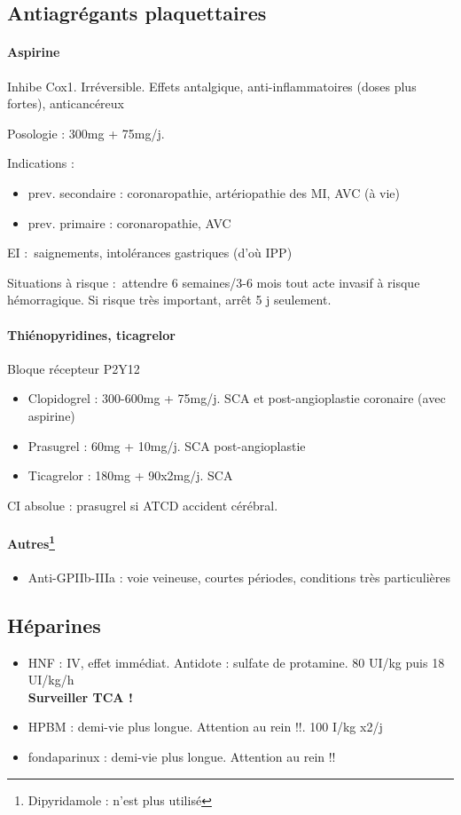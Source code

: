 \documentclass{article}
\begin{document}
\subsection{Antiagrégants plaquettaires}
\paragraph{Aspirine}
Inhibe Cox1. Irréversible. Effets antalgique, anti-inflammatoires (doses plus
fortes), anticancéreux

Posologie : 300mg + 75mg/j.

Indications : 
\begin{itemize}
  \item prev. secondaire : coronaropathie, artériopathie des MI, AVC (à
vie)
\item  prev. primaire : coronaropathie, AVC
\end{itemize}

EI : saignements, intolérances gastriques (d'où IPP)

Situations à risque : attendre 6 semaines/3-6 mois tout acte invasif à risque
hémorragique. Si risque très important, arrêt 5 j seulement.

\paragraph{Thiénopyridines, ticagrelor}
Bloque récepteur P2Y12
\begin{itemize}
  \item Clopidogrel : 300-600mg + 75mg/j. SCA et post-angioplastie coronaire
    (avec aspirine)
  \item Prasugrel : 60mg + 10mg/j. SCA post-angioplastie 
  \item Ticagrelor : 180mg + 90x2mg/j. SCA 
\end{itemize}

CI absolue : prasugrel si ATCD accident cérébral.

\paragraph{Autres\footnote{Dipyridamole : n'est plus utilisé}}
\begin{itemize}
  \item Anti-GPIIb-IIIa : voie veineuse, courtes périodes, conditions très particulières
\end{itemize}

\subsection{Héparines}%
\begin{itemize}
  \item HNF : IV, effet immédiat. Antidote : sulfate de protamine. 80 UI/kg puis
    18 UI/kg/h \\
    \textbf{Surveiller TCA !} \danger
  \item HPBM : demi-vie plus longue. Attention au rein !!. 100 I/kg x2/j
  \item fondaparinux : demi-vie plus longue. Attention au rein !!
\end{itemize}
\end{document}
